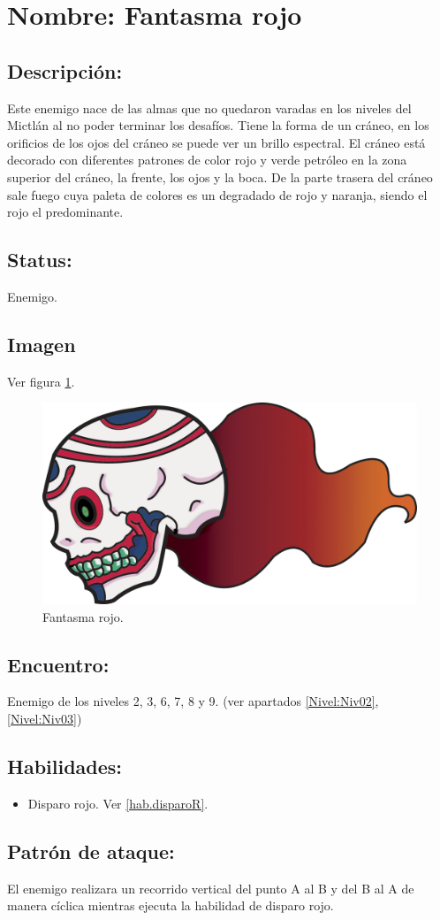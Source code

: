 \section{Nombre: Fantasma rojo}   \label{per:fantasmaR}
\subsection{Descripción:}
Este enemigo nace de las almas que no quedaron varadas en los niveles del Mictlán al no poder terminar los desafíos. Tiene la forma de un cráneo, en los orificios de los ojos del cráneo se puede ver un brillo espectral. El cráneo está decorado con diferentes patrones de color rojo y verde petróleo en la zona superior del cráneo, la frente, los ojos y la boca. De la parte trasera del cráneo sale fuego cuya paleta de colores es un degradado de rojo y naranja, siendo el rojo el predominante. 
\subsection{Status:}
Enemigo.
\subsection{Imagen}
Ver figura \ref{fig:fantasmaR}.
\begin{figure}
	\centering
	\includegraphics[height=0.2 \textheight]{Imagenes/fantasmaRojo}
	\caption{Fantasma rojo.}
	\label{fig:fantasmaR}
\end{figure} 
\subsection{Encuentro:}
Enemigo de los niveles 2, 3, 6, 7, 8 y 9. (ver apartados \ref{Nivel:Niv02}, \ref{Nivel:Niv03})
\subsection{Habilidades:}
\begin{itemize}
	\item Disparo rojo. Ver \ref{hab.disparoR}.
\end{itemize}
\subsection{Patrón de ataque:}
El enemigo realizara un recorrido vertical del punto A al B y del B al A de manera cíclica mientras ejecuta la habilidad de disparo rojo.